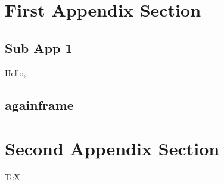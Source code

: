 \appendix



\section*{}

\begin{frame}{\secname}
    \tableofcontents[hideallsubsections,firstsection=3]
\end{frame}

\section{First Appendix Section}
\subsection{Sub App 1}

\begin{frame}{\subsecname}
    \alert{Hello,} 
\end{frame}

\subsection{againframe}

\section{Second Appendix Section}
\begin{frame}{\secname}
    \TeX
\end{frame}

